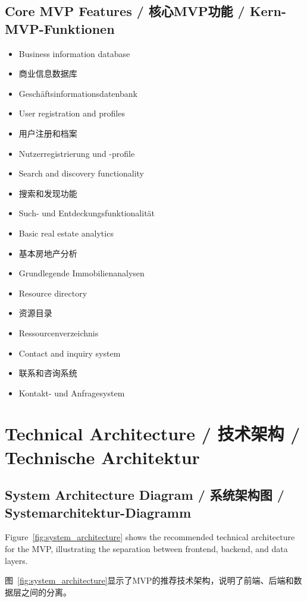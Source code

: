 \subsection{Core MVP Features / 核心MVP功能 / Kern-MVP-Funktionen}
\begin{itemize}
    \item Business information database
    \item 商业信息数据库
    \item Geschäftsinformationsdatenbank
    \item User registration and profiles
    \item 用户注册和档案
    \item Nutzerregistrierung und -profile
    \item Search and discovery functionality
    \item 搜索和发现功能
    \item Such- und Entdeckungsfunktionalität
    \item Basic real estate analytics
    \item 基本房地产分析
    \item Grundlegende Immobilienanalysen
    \item Resource directory
    \item 资源目录
    \item Ressourcenverzeichnis
    \item Contact and inquiry system
    \item 联系和咨询系统
    \item Kontakt- und Anfragesystem
\end{itemize}

\section{Technical Architecture / 技术架构 / Technische Architektur}

\subsection{System Architecture Diagram / 系统架构图 / Systemarchitektur-Diagramm}

Figure~\ref{fig:system_architecture} shows the recommended technical architecture for the MVP, illustrating the separation between frontend, backend, and data layers.

图~\ref{fig:system_architecture}显示了MVP的推荐技术架构，说明了前端、后端和数据层之间的分离。

